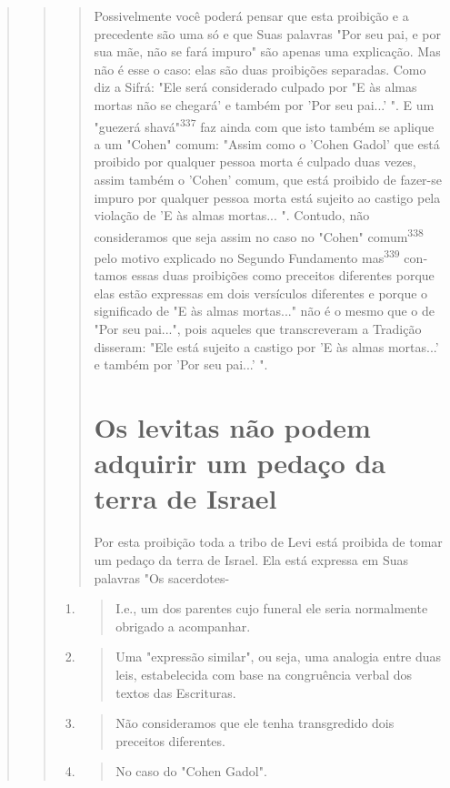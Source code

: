 \begin{quote}
\begin{quote}
\begin{quote}
Possivelmente você poderá pensar que esta proibição e a preceden­te são
uma só e que Suas palavras "Por seu pai, e por sua mãe, não se fará
impu­ro" são apenas uma explicação. Mas não é esse o caso: elas são duas
proibições separadas. Como diz a Sifrá: "Ele será considerado culpado
por "E às almas mor­tas não se chegará' e também por 'Por seu pai...' ".
E um "guezerá shavá"\textsuperscript{337} faz ainda com que isto também
se aplique a um "Cohen" comum: "Assim co­mo o 'Cohen Gadol' que está
proibido por qualquer pessoa morta é culpado duas vezes, assim também o
'Cohen' comum, que está proibido de fazer-se im­puro por qualquer pessoa
morta está sujeito ao castigo pela violação de 'E às almas mortas... ".
Contudo, não consideramos que seja assim no caso no "Co­hen"
comum\textsuperscript{338} pelo motivo explicado no Segundo Fundamento
mas\textsuperscript{339} con­tamos essas duas proibições como preceitos
diferentes porque elas estão ex­pressas em dois versículos diferentes e
porque o significado de "E às almas mor­tas..." não é o mesmo que o de
"Por seu pai...", pois aqueles que transcreve­ram a Tradição disseram:
"Ele está sujeito a castigo por 'E às almas mortas...' e também por 'Por
seu pai...' ".

\section{Os levitas não podem adquirir um pedaço da terra de Israel}

Por esta proibição toda a tribo de Levi está proibida de tomar um pedaço
da terra de Israel. Ela está expressa em Suas palavras "Os sacerdotes-
\end{quote}

\begin{enumerate}
\def\labelenumi{\arabic{enumi}.}
\setcounter{enumi}{335}
\item
 \begin{quote}
 I.e., um dos parentes cujo funeral ele seria normalmente obrigado a
 acompanhar.
 \end{quote}
\item
 \begin{quote}
 Uma "expressão similar", ou seja, uma analogia entre duas leis,
 estabelecida com base na con­gruência verbal dos textos das
 Escrituras.
 \end{quote}
\item
 \begin{quote}
 Não consideramos que ele tenha transgredido dois preceitos diferentes.
 \end{quote}
\item
 \begin{quote}
 No caso do "Cohen Gadol".
 \end{quote}
\end{enumerate}


\end{quote}
\end{quote}

